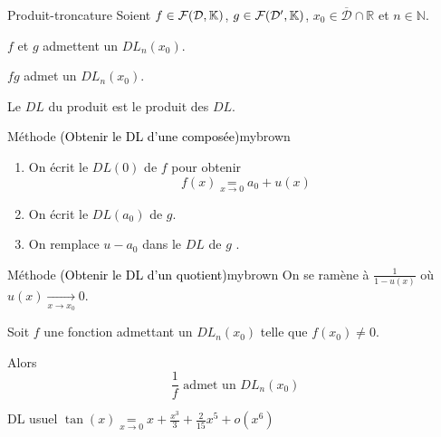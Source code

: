     \begin{prop}{Produit-troncature}{}
        Soient $f \in \mathcal{F}(\mathcal{D},\mathbb{K})$, $g \in \mathcal{F}(\mathcal{D'},\mathbb{K})$, $x_0 \in \overline{\mathcal{D}} \cap \mathbb{R}$ et $n \in \mathbb{N}$.

        \begin{suppose}
            \item $f$ et $g$ admettent un $DL_n(x_0)$.
        \end{suppose}

        \begin{alors}
            \item $fg$ admet un $DL_n(x_0)$.
            \item Le $DL$ du produit est le produit des $DL$.
        \end{alors}
    \end{prop}

    \begin{omed}{Méthode \textcolor{black}{(Obtenir le DL d’une composée)}}{mybrown}
        \begin{enumerate}
            \item On écrit le $DL(0)$ de $f$ pour obtenir 
            \[ f(x) \underset{x \rightarrow 0}{=} a_0 + u(x) \]
            \item On écrit le $DL(a_0)$ de $g$.
            \item On remplace $u - a_0$ dans le $DL$ de $g$ .
        \end{enumerate}
    \end{omed}

    \begin{omed}{Méthode \textcolor{black}{(Obtenir le DL d’un quotient)}}{mybrown}
        On se ramène à $\frac{1}{1-u(x)}$ où $u(x) \underset{x \rightarrow x_0}{\longrightarrow} 0$.
    \end{omed}

    \begin{prop}{}{}
        Soit $f$ une fonction admettant un $DL_n(x_0)$ telle que $f(x_0) \neq 0$. 

        Alors 
        \[ \frac{1}{f} \text{ admet un } DL_n(x_0) \]
    \end{prop}

    \begin{coro}{DL usuel}{}
        $\tan(x) \underset{x \rightarrow 0}{=} x + \frac{x^3}{3} + \frac{2}{15} x^5 + o(x^6)$
    \end{coro}

